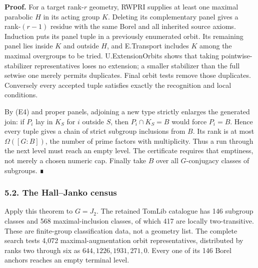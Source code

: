 \documentclass[
  11pt,
  a4paper,
]{article}
\begin{document}
\textbf{Proof.} For a target rank-\(r\) geometry, RWPRI supplies at
least one maximal parabolic \(H\) in its acting group \(K\). Deleting
its complementary panel gives a rank-\((r-1)\) residue with the same
Borel and all inherited source axioms. Induction puts its panel tuple in
a previously enumerated orbit. Its remaining panel lies inside \(K\) and
outside \(H\), and E.Transport includes \(K\) among the maximal
overgroups to be tried. U.ExtensionOrbits shows that taking
pointwise-stabilizer representatives loses no extension; a smaller
stabilizer than the full setwise one merely permits duplicates. Final
orbit tests remove those duplicates. Conversely every accepted tuple
satisfies exactly the recognition and local conditions.

By (E4) and proper panels, adjoining a new type strictly enlarges the
generated join: if \(P_i\) lay in \(K_S\) for \(i\) outside \(S\), then
\(P_i\cap K_S=B\) would force \(P_i=B\). Hence every tuple gives a chain
of strict subgroup inclusions from \(B\). Its rank is at most
\(\Omega([G:B])\), the number of prime factors with multiplicity. Thus a
run through the next level must reach an empty level. The certificate
requires that emptiness, not merely a chosen numeric cap. Finally take
\(B\) over all \(G\)-conjugacy classes of subgroups. ∎

\subsubsection{5.2. The Hall--Janko census}\label{the-halljanko-census}

Apply this theorem to \(G=J_2\). The retained TomLib catalogue has 146
subgroup classes and 568 maximal-inclusion classes, of which 417 are
locally two-transitive. These are finite-group classification data, not
a geometry list. The complete search tests 4,072 maximal-augmentation
orbit representatives, distributed by ranks two through six as
\(644,1226,1931,271,0\). Every one of its 146 Borel anchors reaches an
empty terminal level.
\end{document}
